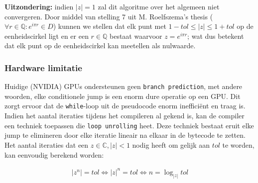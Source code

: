 \documentclass{article}
\begin{document}
\textbf{Uitzondering:} indien $\left|z\right| = 1$ zal dit algoritme over het algemeen niet convergeren. Door middel van stelling 7 uit M. Roelfszema's thesis ($\forall r \in \mathbb{Q}: e^{i\pi r} \in D$) kunnen we stellen dat elk punt met $1 - tol \leq \left|z\right| \leq 1 + tol$ op de eenheidscirkel ligt en er een $r \in \mathbb{Q}$ bestaat waarvoor $z = e^{i\pi r}$; wat dus betekent dat elk punt op de eenheidscirkel kan meetellen als nulwaarde.

\subsubsection{Hardware limitatie}
Huidige (NVIDIA) GPUs ondersteunen geen \verb|branch prediction|, met andere woorden, elke conditionele jump is een enorm dure operatie op een GPU. Dit zorgt ervoor dat de \verb|while|-loop uit de pseudocode enorm ineffici\"ent en traag is. Indien het aantal iteraties tijdens het compileren al gekend is, kan de compiler een techniek toepassen die \verb|loop unrolling| heet. Deze techniek bestaat eruit elke jump te elimineren door elke iteratie lineair na elkaar in de bytecode te zetten. Het aantal iteraties dat een $z \in \mathbb{C}, \left|z\right| < 1$ nodig heeft om gelijk aan $tol$ te worden, kan eenvoudig berekend worden:

\begin{align*}
\left|z^n\right| = tol \iff \left|z\right|^n = tol \iff n = \log_{\left|z\right|}{tol}
\end{align*}
\end{document}

